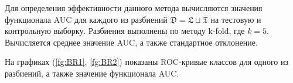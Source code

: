 \documentclass[12pt,twoside]{article}
\begin{document}
Для определения эффективности данного метода вычисляются значения функционала AUC для каждого из разбиений $\mathfrak{D}=\mathfrak{L}\sqcup\mathfrak{T}$ на тестовую и контрольную выборку. Разбиения выполнены по методу k-fold, где $k=5$. Вычисляется среднее значение AUC, а также стандартное отклонение.

На графиках (\ref{fg:BR1}, \ref{fg:BR2}) показаны ROC-кривые классов для одного из разбиений, а также значение функционала AUC.


\begin{figure}[h]
	\\
	\\

\end{figure}
\end{document}

